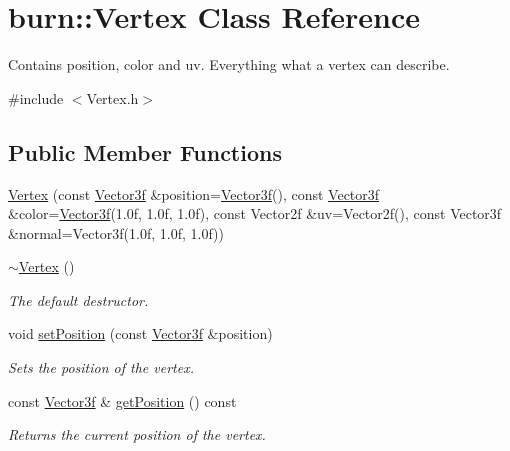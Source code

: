 \hypertarget{classburn_1_1_vertex}{\section{burn\-:\-:Vertex Class Reference}
\label{classburn_1_1_vertex}
}


Contains position, color and uv. Everything what a vertex can describe.  




{\ttfamily \#include $<$Vertex.\-h$>$}

\subsection*{Public Member Functions}
\begin{DoxyCompactItemize}
\item 
\hyperlink{classburn_1_1_vertex_aa387f73cc33b830457c492cd8009bb38}{Vertex} (const \hyperlink{namespaceburn_afdd7cfb352b9612432faf6947b6fff74}{Vector3f} \&position=\hyperlink{namespaceburn_afdd7cfb352b9612432faf6947b6fff74}{Vector3f}(), const \hyperlink{namespaceburn_afdd7cfb352b9612432faf6947b6fff74}{Vector3f} \&color=\hyperlink{namespaceburn_afdd7cfb352b9612432faf6947b6fff74}{Vector3f}(1.\-0f, 1.\-0f, 1.\-0f), const Vector2f \&uv=\-Vector2f(), const Vector3f \&normal=\-Vector3f(1.\-0f, 1.\-0f, 1.\-0f))
\item 
\hyperlink{classburn_1_1_vertex_ad950d9459711c1ba4223de35623f75b6}{$\sim$\-Vertex} ()
\begin{DoxyCompactList}\small\item\em The default destructor. \end{DoxyCompactList}\item 
void \hyperlink{classburn_1_1_vertex_aa38bae183bbe857f9fabeb8e5510e9a0}{set\-Position} (const \hyperlink{namespaceburn_afdd7cfb352b9612432faf6947b6fff74}{Vector3f} \&position)
\begin{DoxyCompactList}\small\item\em Sets the position of the vertex. \end{DoxyCompactList}\item 
const \hyperlink{namespaceburn_afdd7cfb352b9612432faf6947b6fff74}{Vector3f} \& \hyperlink{classburn_1_1_vertex_adb40e916c74b634524b42653e0cb3cc7}{get\-Position} () const 
\begin{DoxyCompactList}\small\item\em Returns the current position of the vertex. \end{DoxyCompactList}\item 

\end{DoxyCompactItemize}
